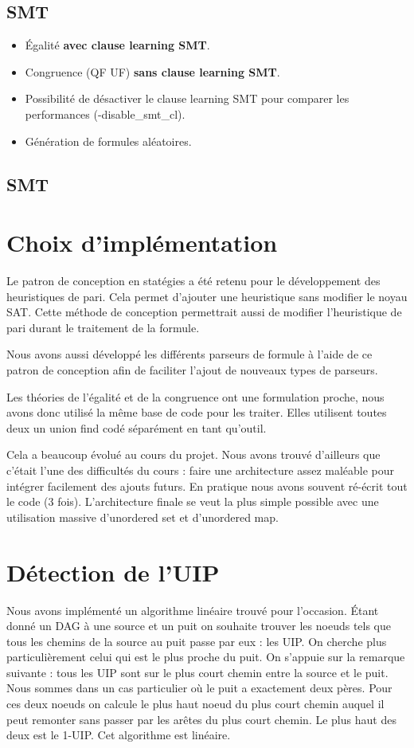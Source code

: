 \documentclass{article}
\begin{document}
\subsection{SMT}
\begin{itemize}
\item Égalité \textbf{avec clause learning SMT}.
\item Congruence (QF UF) \textbf{sans clause learning SMT}.
\item Possibilité de désactiver le clause learning SMT pour comparer les performances (-disable\_smt\_cl).
\item Génération de formules aléatoires.
\end{itemize}
\subsection{SMT}

\section{Choix d'implémentation}
Le patron de conception en statégies a été retenu pour le développement des heuristiques de pari. Cela permet d'ajouter une heuristique sans modifier le noyau SAT. 
Cette méthode de conception permettrait aussi de modifier l'heuristique de pari durant le traitement de la formule.

Nous avons aussi développé les différents parseurs de formule à l'aide de ce patron de conception afin de faciliter l'ajout de nouveaux types de parseurs.

Les théories de l'égalité et de la congruence ont une formulation proche, nous avons donc utilisé la même base de code pour les traiter.
Elles utilisent toutes deux un union find codé séparément en tant qu'outil.

Cela a beaucoup évolué au cours du projet. Nous avons trouvé d'ailleurs que c'était l'une des difficultés du cours : faire une architecture assez maléable pour intégrer facilement des ajouts futurs. En pratique nous avons souvent ré-écrit tout le code (3 fois).
L'architecture finale se veut la plus simple possible avec une utilisation massive d'unordered set et d'unordered map.

\section{Détection de l'UIP}
Nous avons implémenté un algorithme linéaire trouvé pour l'occasion. Étant donné un DAG à une source et un puit on souhaite trouver les noeuds tels que tous les chemins de la source au puit passe par eux : les UIP. On cherche plus particulièrement celui qui est le plus proche du puit.
On s'appuie sur la remarque suivante : tous les UIP sont sur le plus court chemin entre la source et le puit. \\
Nous sommes dans un cas particulier où le puit a exactement deux pères. Pour ces deux noeuds on calcule le plus haut noeud du plus court chemin auquel il peut remonter sans passer par les arêtes du plus court chemin. Le plus haut des deux est le 1-UIP. Cet algorithme est linéaire.
\end{document}
